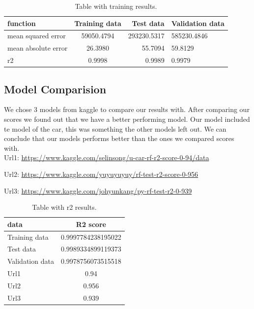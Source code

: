 \begin{table}[h!]
    \begin{center}
        \caption{Table with training results.}
        \label{tab:training results}
        \begin{tabular}{l|S|r|l} %
            \textbf{function} & \textbf{Training data} & \textbf{Test data} & \textbf{Validation data}\\
            \hline
            mean squared error & 59050.4794 & 293230.5317 & 585230.4846\\
            mean absolute error & 26.3980 & 55.7094 & 59.8129\\
            r2 & 0.9998 & 0.9989 & 0.9979\\
        \end{tabular}
    \end{center}
\end{table}

\subsection{Model Comparision}

We chose 3 models from kaggle to compare our results with. After comparing our scores we found out that we have a better performing model. Our model included te model of the car, this was something the other models left out. We can conclude that our models performs better than the ones we compared scores with.
\\
Url1: \url{https://www.kaggle.com/selinsong/u-car-rf-r2-score-0-94/data}

Url2: \url{https://www.kaggle.com/yuyuyuyuy/rf-test-r2-score-0-956}

Url3: \url{https://www.kaggle.com/johyunkang/py-rf-test-r2-0-939}

\begin{table}[h!]
    \begin{center}
        \caption{Table with r2 results.}
        \label{tab:training results}
        \begin{tabular}{l|S} %
            \textbf{data} & \textbf{R2 score} \\
            \hline
            Training data & 0.9997784238195022\\
            Test data & 0.9989334899119373 \\
            Validation data & 0.9978756073515518\\
            Url1 & 0.94\\
            Url2 & 0.956\\
            Url3 & 0.939\\
        \end{tabular}
    \end{center}
\end{table}

